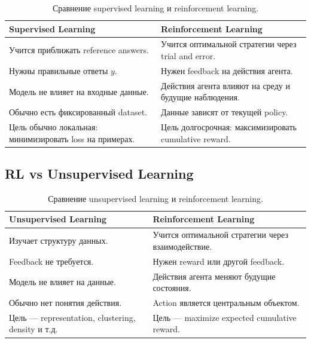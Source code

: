 \documentclass[a4paper,12pt]{article}
\begin{document}
\begin{table}[H]
\centering
\begin{tabular}{p{} p{}}
\toprule
\textbf{Supervised Learning} & \textbf{Reinforcement Learning} \\
\midrule
Учится приближать reference answers. &
Учится оптимальной стратегии через trial and error. \\

Нужны правильные ответы \(y\). &
Нужен feedback на действия агента. \\

Модель не влияет на входные данные. &
Действия агента влияют на среду и будущие наблюдения. \\

Обычно есть фиксированный dataset. &
Данные зависят от текущей policy. \\

Цель обычно локальная: минимизировать loss на примерах. &
Цель долгосрочная: максимизировать cumulative reward. \\
\bottomrule
\end{tabular}
\caption{Сравнение supervised learning и reinforcement learning.}
\end{table}

\subsection{RL vs Unsupervised Learning}

\begin{table}[H]
\centering
\begin{tabular}{p{} p{}}
\toprule
\textbf{Unsupervised Learning} & \textbf{Reinforcement Learning} \\
\midrule
Изучает структуру данных. &
Учится оптимальной стратегии через взаимодействие. \\

Feedback не требуется. &
Нужен reward или другой feedback. \\

Модель не влияет на данные. &
Действия агента меняют будущие состояния. \\

Обычно нет понятия действия. &
Action является центральным объектом. \\

Цель --- representation, clustering, density и т.д. &
Цель --- maximize expected cumulative reward. \\
\bottomrule
\end{tabular}
\caption{Сравнение unsupervised learning и reinforcement learning.}
\end{table}
\end{document}
